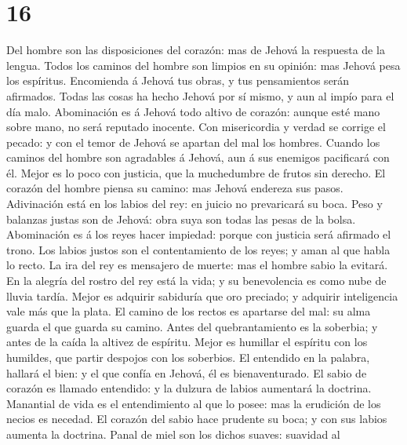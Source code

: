 \hypertarget{section-15}{%
\section{16}\label{section-15}}

 Del hombre son las disposiciones del corazón: mas de Jehová
la respuesta de la lengua.  Todos los caminos del hombre son
limpios en su opinión: mas Jehová pesa los espíritus. 
Encomienda á Jehová tus obras, y tus pensamientos serán afirmados.
 Todas las cosas ha hecho Jehová por sí mismo, y aun al
impío para el día malo.  Abominación es á Jehová todo altivo
de corazón: aunque esté mano sobre mano, no será reputado inocente.
 Con misericordia y verdad se corrige el pecado: y con el
temor de Jehová se apartan del mal los hombres.  Cuando los
caminos del hombre son agradables á Jehová, aun á sus enemigos
pacificará con él.  Mejor es lo poco con justicia, que la
muchedumbre de frutos sin derecho.  El corazón del hombre
piensa su camino: mas Jehová endereza sus pasos. 
Adivinación está en los labios del rey: en juicio no prevaricará su
boca.  Peso y balanzas justas son de Jehová: obra suya son
todas las pesas de la bolsa.  Abominación es á los reyes
hacer impiedad: porque con justicia será afirmado el trono.
 Los labios justos son el contentamiento de los reyes; y
aman al que habla lo recto.  La ira del rey es mensajero de
muerte: mas el hombre sabio la evitará.  En la alegría del
rostro del rey está la vida; y su benevolencia es como nube de lluvia
tardía.  Mejor es adquirir sabiduría que oro preciado; y
adquirir inteligencia vale más que la plata.  El camino de
los rectos es apartarse del mal: su alma guarda el que guarda su camino.
 Antes del quebrantamiento es la soberbia; y antes de la
caída la altivez de espíritu.  Mejor es humillar el
espíritu con los humildes, que partir despojos con los soberbios.
 El entendido en la palabra, hallará el bien: y el que
confía en Jehová, él es bienaventurado.  El sabio de
corazón es llamado entendido: y la dulzura de labios aumentará la
doctrina.  Manantial de vida es el entendimiento al que lo
posee: mas la erudición de los necios es necedad.  El
corazón del sabio hace prudente su boca; y con sus labios aumenta la
doctrina.  Panal de miel son los dichos suaves: suavidad al
